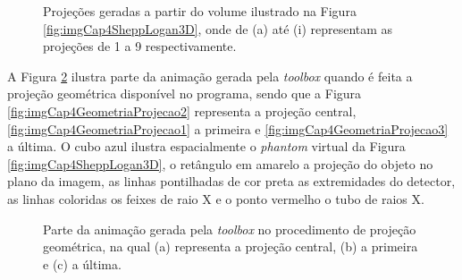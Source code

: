 \begin{figure}[htb]
	\centering
	
	\caption{Projeções geradas a partir do volume ilustrado na Figura \ref{fig:imgCap4SheppLogan3D}, onde de (a) até (i) representam as projeções de 1 a 9 respectivamente.}
	
	
	\label{fig:imgCap4Projecoes}
\end{figure}

 
A Figura \ref{fig:imgCap4GeometriaProjecao} ilustra parte da animação gerada pela \textit{toolbox} quando é feita a projeção geométrica  disponível no programa, sendo que a Figura \ref{fig:imgCap4GeometriaProjecao2} representa a projeção central, \ref{fig:imgCap4GeometriaProjecao1} a primeira e \ref{fig:imgCap4GeometriaProjecao3} a última. O cubo azul ilustra espacialmente o \textit{phantom} virtual da Figura \ref{fig:imgCap4SheppLogan3D}, o retângulo em amarelo a projeção do objeto no plano da imagem, as linhas pontilhadas de cor preta as extremidades do detector, as linhas coloridas os feixes de raio X  e o ponto vermelho o tubo de raios X. 

\begin{figure}[htb]
	\centering
	
	\caption{Parte da animação gerada pela \textit{toolbox} no procedimento de projeção geométrica, na qual (a) representa a projeção central, (b) a primeira e (c) a última.}
	
	
	
	\label{fig:imgCap4GeometriaProjecao}
\end{figure}

